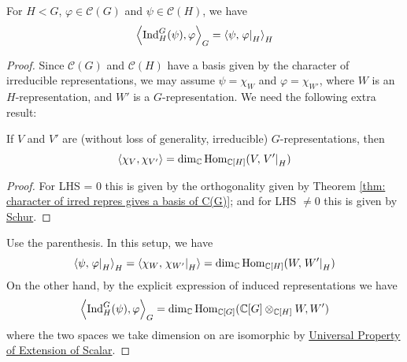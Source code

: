 \documentclass{article}
\begin{document}
\begin{theorem}\label{thm: Frobenius Reciprocity}
    For $H < G$, $\varphi \in \mathcal{C}(G)$ and $\psi \in \mathcal{C}(H)$, we have
    \[
        \left\langle \mathrm{Ind}_H^G(\psi), \varphi \right\rangle_G = \left\langle \psi, \left.\varphi\right|_{H} \right\rangle_H
    \]
\end{theorem}

\begin{proof}
    Since $\mathcal{C}(G)$ and $\mathcal{C}(H)$ have a basis given by the character of irreducible representations, we may assume $\psi = \chi_W$ and $\varphi = \chi_{W'}$, where $W$ is an $H$-representation, and $W'$ is a $G$-representation. We need the following extra result:

    \begin{parenthesis}
        If $V$ and $V'$ are (without loss of generality, irreducible) $G$-representations, then
        \[
            \left\langle \chi_V, \chi_{V'} \right\rangle = \dim_{\mathbb{C}} \mathrm{Hom}_{\mathbb{C}[H]} (V, \left.V'\right|_{H})
        \]
    \end{parenthesis}

    \begin{proof}
        For LHS = 0 this is given by the orthogonality given by Theorem \ref{thm: character of irred repres gives a basis of C(G)}; and for LHS $\neq 0$ this is given by \hyperref[lem: Schur]{Schur}.
    \end{proof}

    Use the parenthesis. In this setup, we have
    \[
        \left\langle \psi, \left.\varphi\right|_{H} \right\rangle_H = \left\langle \chi_{W}, \left.\chi_{W'}\right|_{H} \right\rangle = \dim_{\mathbb{C}} \mathrm{Hom}_{\mathbb{C}[H]} (W, \left.W'\right|_{H})
    \]
    On the other hand, by the explicit expression of induced representations we have
    \[
        \left\langle \mathrm{Ind}_H^G(\psi), \varphi \right\rangle_G = \dim_{\mathbb{C}} \mathrm{Hom}_{\mathbb{C}[G]} (\mathbb{C}[G] \otimes_{\mathbb{C}[H]} W, W')
    \]
    where the two spaces we take dimension on are isomorphic by \hyperref[prop: Universal Property of Extension of Scalar]{Universal Property of Extension of Scalar}.
\end{proof}
\end{document}
